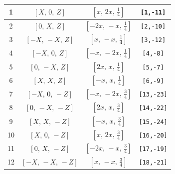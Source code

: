 \documentclass[fleqn,8pt]{jsarticle}
\begin{document}
\begin{longtable}{cccc}
1 & $\left[ X,\, 0,\, Z \right]$ & $\left[ x,\, 2 x,\, \frac{1}{4} \right]$ & {\tt [1,-11]} \\ \hline
2 & $\left[ 0,\, X,\, Z \right]$ & $\left[ - 2 x,\, - x,\, \frac{1}{4} \right]$ & {\tt [2,-10]} \\ \hline
3 & $\left[ - X,\, - X,\, Z \right]$ & $\left[ x,\, - x,\, \frac{1}{4} \right]$ & {\tt [3,-12]} \\ \hline
4 & $\left[ - X,\, 0,\, Z \right]$ & $\left[ - x,\, - 2 x,\, \frac{1}{4} \right]$ & {\tt [4,-8]} \\ \hline
5 & $\left[ 0,\, - X,\, Z \right]$ & $\left[ 2 x,\, x,\, \frac{1}{4} \right]$ & {\tt [5,-7]} \\ \hline
6 & $\left[ X,\, X,\, Z \right]$ & $\left[ - x,\, x,\, \frac{1}{4} \right]$ & {\tt [6,-9]} \\ \hline
7 & $\left[ - X,\, 0,\, - Z \right]$ & $\left[ - x,\, - 2 x,\, \frac{3}{4} \right]$ & {\tt [13,-23]} \\ \hline
8 & $\left[ 0,\, - X,\, - Z \right]$ & $\left[ 2 x,\, x,\, \frac{3}{4} \right]$ & {\tt [14,-22]} \\ \hline
9 & $\left[ X,\, X,\, - Z \right]$ & $\left[ - x,\, x,\, \frac{3}{4} \right]$ & {\tt [15,-24]} \\ \hline
10 & $\left[ X,\, 0,\, - Z \right]$ & $\left[ x,\, 2 x,\, \frac{3}{4} \right]$ & {\tt [16,-20]} \\ \hline
11 & $\left[ 0,\, X,\, - Z \right]$ & $\left[ - 2 x,\, - x,\, \frac{3}{4} \right]$ & {\tt [17,-19]} \\ \hline
12 & $\left[ - X,\, - X,\, - Z \right]$ & $\left[ x,\, - x,\, \frac{3}{4} \right]$ & {\tt [18,-21]} \\
\end{longtable}
\renewcommand{\arraystretch}{1.2}
\end{document}
